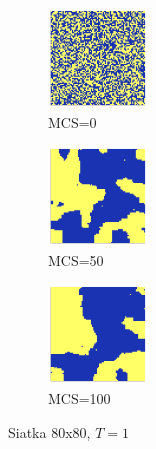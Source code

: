 \documentclass[12pt]{article}
\begin{document}
\begin{figure}[H]
  \centering

  \begin{subfigure}[b]{0.3\linewidth}
    \centering
    \includegraphics[width=100px, height=100px]{../data/snaps/snap80_temp1.0_moment1.png}
    \caption{MCS=0}
    \label{fig:image1}
  \end{subfigure}
  \hfill
  \begin{subfigure}[b]{0.3\linewidth}
    \centering
    \includegraphics[width=100px, height=100px]{../data/snaps/snap80_temp1.0_moment50.png}
    \caption{MCS=50}
    \label{fig:image2}
  \end{subfigure}
  \hfill
  \begin{subfigure}[b]{0.3\linewidth}
    \centering
    \includegraphics[width=100px, height=100px]{../data/snaps/snap80_temp1.0_moment100.png}
    \caption{MCS=100}
    \label{fig:image3}
  \end{subfigure}

  \caption{Siatka $80$x$80$, $T=1$}
  \label{fig:series}
\end{figure}
\end{document}
